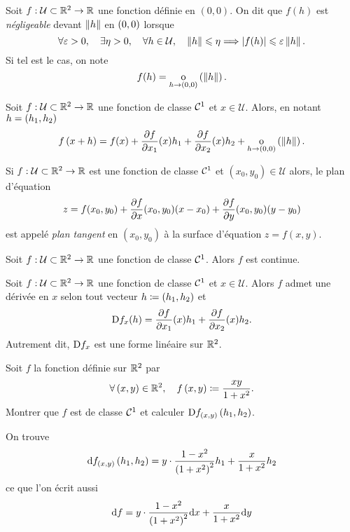 \documentclass{magnolia}
\begin{document}
\begin{definition}
Soit $f:\mathcal{U}\subset\mathbb{R}^2\to\mathbb{R}$ une fonction définie en $(0,0)$. On dit que $f(h)$ est \emph{négligeable} devant $\left\|h\right\|$ en $\left(0,0\right)$ lorsque
\[\forall\varepsilon>0 ,\quad \exists \eta>0 ,\quad \forall h\in\mathcal{U}
  ,\quad \left\|h\right\|\leqslant\eta \Longrightarrow \left|f(h)\right|\leqslant\varepsilon\left\|h\right\|.\]
Si tel est le cas, on note
\[f(h)=\underset{h \rightarrow \left(0,0\right)}{\text{o}}\left(\left\|h\right\|\right).\]
\end{definition}


\begin{proposition}
Soit $f:\mathcal{U}\subset\mathbb{R}^2\to\mathbb{R}$ une fonction de classe $\mathcal{C}^{1}$ et
$x\in\mathcal{U}$. Alors, en notant $h=\left(h_1,h_2\right)$
\[f\left(x+h\right)=f(x)+\frac{\partial f}{\partial x_1}(x)h_1+\frac{\partial f}{\partial x_2}(x)h_2+
  \underset{h \rightarrow \left(0,0\right)}{\text{o}}\left(\left\|h\right\|\right).\]
\end{proposition}

\begin{remarqueUnique}
\remarque Si $f:\mathcal{U}\subset\mathbb{R}^2\to\mathbb{R}$ est une fonction de classe $\mathcal{C}^{1}$ et $(x_0,y_0)\in\mathcal{U}$ alors,
  le plan d'équation
  \[z=f(x_0,y_0)+\frac{\partial f}{\partial x}(x_0,y_0)(x-x_0)+\frac{\partial f}{\partial y}(x_0,y_0)(y-y_0)\]
  est appelé \emph{plan tangent} en $(x_0,y_0)$ à la surface d'équation $z=f(x,y)$.
\end{remarqueUnique}

\begin{proposition}
Soit $f:\mathcal{U}\subset\mathbb{R}^2\to\mathbb{R}$ une fonction de classe $\mathcal{C}^{1}$.
Alors $f$ est continue.
\end{proposition}

\begin{proposition}
Soit $f:\mathcal{U}\subset\mathbb{R}^2\to\mathbb{R}$ une fonction de classe $\mathcal{C}^{1}$ et
$x\in\mathcal{U}$. Alors $f$ admet une dérivée en $x$ selon tout vecteur
$h\coloneqq\left(h_1,h_2\right)$ et
\[{\rm D}f_x(h)=\frac{\partial f}{\partial x_1}(x)h_1 
  +\frac{\partial f}{\partial x_2}(x)h_2.\]
Autrement dit, ${\rm D}f_x$ est une forme linéaire sur $\mathbb{R}^2$.
\end{proposition}



\begin{exoUnique}
\exo Soit $f$ la fonction définie sur $\mathbb{R}^2$ par
  \[\forall\left(x,y\right)\in\mathbb{R}^2 ,\quad f\left(x,y\right)\coloneqq\frac{xy}{1+x^2}.\]
  Montrer que $f$ est de classe $\mathcal{C}^{1}$ et calculer
  $\text{D}f_{\left(x,y\right)}\left(h_1,h_2\right)$.
  \begin{sol}
  On trouve
  \[\text{d}f_{\left(x,y\right)}\left(h_1,h_2\right)=y\cdot\frac{1-x^2}{\left(1+x^2\right)^2}h_1+
    \frac{x}{1+x^2}h_2\]
  ce que l'on écrit aussi
  \[\text{d}f=y\cdot\frac{1-x^2}{\left(1+x^2\right)^2}\text{d}x+
    \frac{x}{1+x^2}\text{d}y\]
  \end{sol}
\end{exoUnique}
\end{document}
